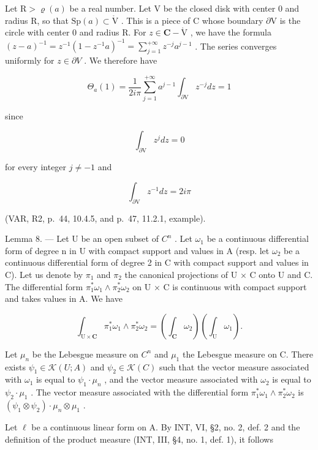 Let \(\mathrm{R} > \varrho(a)\) be a real number. Let V be the closed disk with center 0 and radius R, so that \(\mathrm{Sp}(a) \subset \mathring{\mathrm{V}}\) . This is a piece of C whose boundary \(\partial\mathrm{V}\) is the circle with center 0 and radius R. For \(z \in \mathbf{C} - \mathring{\mathrm{V}}\) , we have the formula \((z - a)^{-1} = z^{-1}(1 - z^{-1}a)^{-1} = \sum_{j=1}^{+\infty} z^{-j} a^{j-1}\) . The series converges uniformly for \(z \in \partial V\) . We therefore have

\[
\Theta_ {a} (1) = \frac {1}{2 i \pi} \sum_ {j = 1} ^ {+ \infty} a ^ {j - 1} \int_ {\partial \mathrm{V}} z ^ {- j} d z = 1
\]

since

\[
\int_ {\partial \mathrm{V}} z ^ {j} d z = 0
\]

for every integer \(j \neq -1\) and

\[
\int_ {\partial \mathrm{V}} z ^ {- 1} d z = 2 i \pi
\]

(VAR, R2, p.~44, 10.4.5, and p.~47, 11.2.1, example).

Lemma 8. --- Let U be an open subset of \(C^{n}\) . Let \(\omega_{1}\) be a continuous differential form of degree n in U with compact support and values in A (resp. let \(\omega_{2}\) be a continuous differential form of degree 2 in C with compact support and values in C). Let us denote by \(\pi_{1}\) and \(\pi_{2}\) the canonical projections of U × C onto U and C. The differential form \(\pi_{1}^{*}\omega_{1} \wedge \pi_{2}^{*}\omega_{2}\) on U × C is continuous with compact support and takes values in A. We have

\[
\int_ {\mathrm{U} \times \mathbf {C}} \pi_ {1} ^ {*} \omega_ {1} \wedge \pi_ {2} ^ {*} \omega_ {2} = \left(\int_ {\mathbf {C}} \omega_ {2}\right) \left(\int_ {\mathrm{U}} \omega_ {1}\right).
\]

Let \(\mu_{n}\) be the Lebesgue measure on \(C^{n}\) and \(\mu_{1}\) the Lebesgue measure on C. There exists \(\psi_{1} \in \mathcal{K}(U;A)\) and \(\psi_{2} \in \mathcal{K}(C)\) such that the vector measure associated with \(\omega_{1}\) is equal to \(\psi_{1} \cdot \mu_{n}\) , and the vector measure associated with \(\omega_{2}\) is equal to \(\psi_{2} \cdot \mu_{1}\) . The vector measure associated with the differential form \(\pi_{1}^{*}\omega_{1} \wedge \pi_{2}^{*}\omega_{2}\) is \((\psi_{1} \otimes \psi_{2}) \cdot \mu_{n} \otimes \mu_{1}\) .

Let \(\ell\) be a continuous linear form on A. By INT, VI, §2, no. 2, def. 2 and the definition of the product measure (INT, III, §4, no. 1, def. 1), it follows


